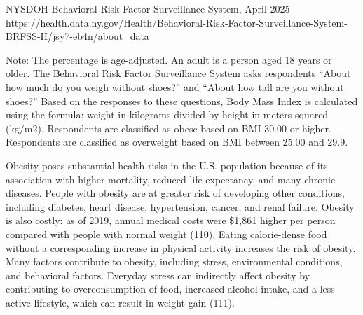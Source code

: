 \documentclass[
  english,
  letterpaper,
]{report}
\begin{document}
\begin{tcolorbox}[enhanced jigsaw, breakable, leftrule=.75mm, title=\textcolor{quarto-callout-note-color}{\faInfo}\hspace{0.5em}{Source}, bottomrule=.15mm, opacityback=0, left=2mm, colback=white, bottomtitle=1mm, coltitle=black, colbacktitle=quarto-callout-note-color!10!white, colframe=quarto-callout-note-color-frame, opacitybacktitle=0.6, toptitle=1mm, titlerule=0mm, arc=.35mm, rightrule=.15mm, toprule=.15mm]

NYSDOH Behavioral Risk Factor Surveillance System, April 2025
https://health.data.ny.gov/Health/Behavioral-Risk-Factor-Surveillance-System-BRFSS-H/jsy7-eb4n/about\_data

\end{tcolorbox}

\begin{tcolorbox}[enhanced jigsaw, breakable, leftrule=.75mm, title=\textcolor{quarto-callout-note-color}{\faInfo}\hspace{0.5em}{Note}, bottomrule=.15mm, opacityback=0, left=2mm, colback=white, bottomtitle=1mm, coltitle=black, colbacktitle=quarto-callout-note-color!10!white, colframe=quarto-callout-note-color-frame, opacitybacktitle=0.6, toptitle=1mm, titlerule=0mm, arc=.35mm, rightrule=.15mm, toprule=.15mm]

Note: The percentage is age-adjusted. An adult is a person aged 18 years
or older. The Behavioral Risk Factor Surveillance System asks
respondents ``About how much do you weigh without shoes?'' and ``About
how tall are you without shoes?'' Based on the responses to these
questions, Body Mass Index is calculated using the formula: weight in
kilograms divided by height in meters squared (kg/m2). Respondents are
classified as obese based on BMI 30.00 or higher. Respondents are
classified as overweight based on BMI between 25.00 and 29.9.

\end{tcolorbox}

Obesity poses substantial health risks in the U.S. population because of
its association with higher mortality, reduced life expectancy, and many
chronic diseases. People with obesity are at greater risk of developing
other conditions, including diabetes, heart disease, hypertension,
cancer, and renal failure. Obesity is also costly: as of 2019, annual
medical costs were \$1,861 higher per person compared with people with
normal weight (110). Eating calorie-dense food without a corresponding
increase in physical activity increases the risk of obesity. Many
factors contribute to obesity, including stress, environmental
conditions, and behavioral factors. Everyday stress can indirectly
affect obesity by contributing to overconsumption of food, increased
alcohol intake, and a less active lifestyle, which can result in weight
gain (111).
\end{document}
